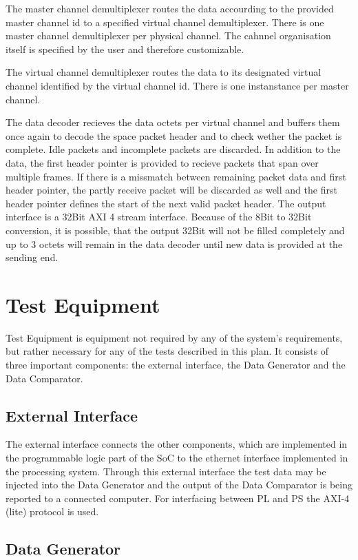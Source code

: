 The master channel demultiplexer routes the data accourding to the provided master channel id to a specified virtual channel demultiplexer. There is one master channel demultiplexer per physical channel. The cahnnel organisation itself is specified by the user and therefore customizable.

The virtual channel demultiplexer routes the data to its designated virtual channel identified by the virtual channel id. There is one instanstance per master channel.

The data decoder recieves the data octets per virtual channel and buffers them once again to decode the space packet header and to check wether the packet is complete. Idle packets and incomplete packets are discarded. In addition to the data, the first header pointer is provided to recieve packets that span over multiple frames. If there is a missmatch between remaining packet data and first header pointer, the partly receive packet will be discarded as well and the first header pointer defines the start of the next valid packet header. The output interface is a 32Bit AXI 4 stream interface. Because of the 8Bit to 32Bit conversion, it is possible, that the output 32Bit will not be filled completely and up to 3 octets will remain in the data decoder until new data is provided at the sending end.

\section{Test Equipment}
Test Equipment is equipment not required by any of the system's requirements, but rather necessary for any of the tests described in this plan. It consists of three important components: the external interface, the Data Generator and the Data Comparator.

\subsection{External Interface}

The external interface connects the other components, which are implemented in the programmable logic part of the SoC to the ethernet interface implemented in the processing system. Through this external interface the test data may be injected into the Data Generator and the output of the Data Comparator is being reported to a connected computer. For interfacing between PL and PS the AXI-4 (lite) protocol is used.

\subsection{Data Generator}

